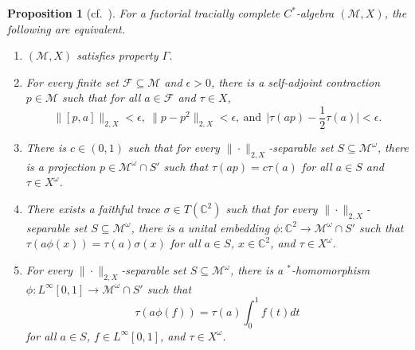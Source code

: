\documentclass[a4paper,11pt]{amsart}
\newtheorem{proposition}[theorem]{Proposition}
\theoremstyle{definition}
\numberwithin{equation}{section}
\numberwithin{theorem}{section}
\newcommand{\C}{\mathbb C}
\newcommand{\M}{\mathcal{M}}
\begin{document}
\begin{proposition}[{cf.\ \cite[Proposition~2.3]{CETW}}]\label{prop:Gamma}
For a factorial tracially complete $C^*$-algebra $(\M, X)$, the following are equivalent.
\begin{enumerate}[wide, labelwidth=0pt, labelindent=0pt]
	\item\label{item:Gamma} $(\M, X)$ satisfies property $\Gamma$.
	
		\item\label{item:Gamma-approx} For every finite set $\mathcal F \subseteq \M$ and $\epsilon > 0$, there is a self-adjoint contraction $p \in \M$ such that for all $a \in \mathcal F$ and $\tau \in X$,
	\begin{equation}
		\|[p, a]\|_{2, X} < \epsilon,\
		\|p - p^2\|_{2, X} < \epsilon,\ \text{and}\ \
		\big| \tau(ap) - \frac12 \tau(a)\big| < \epsilon.
	\end{equation}
	
	\item\label{item:approx-central-projection} There is  $c \in (0, 1)$ such that for every $\|\cdot\|_{2, X}$-separable set $S \subseteq \M^\omega$, there is a projection $p \in \M^\omega \cap S'$ such that $\tau(ap) = c \tau(a)$ for all $a \in S$ and $\tau \in X^\omega$.
 
\item\label{item:embeddingC2} There exists a faithful trace $\sigma \in T(\C^2)$ such that for every $\|\cdot\|_{2, X}$-separable set $S \subseteq \M^\omega$, there is a unital embedding $\phi\colon \C^2 \rightarrow \M^\omega \cap S'$ such that $\tau(a\phi(x)) = \tau(a)\sigma(x)$ for all $a \in S$, $x \in \C^2$, and $\tau \in X^\omega$.

 
  	\item\label{item:approx-central-interval} For every $\|\cdot\|_{2, X}$-separable set $S \subseteq \M^\omega$, there is a $^*$-homomorphism $\phi \colon L^\infty[0, 1] \rightarrow \M^\omega \cap S'$ such that 
	\begin{equation}
		\tau(a \phi(f)) = \tau(a) \int_0^1 f(t) dt
	\end{equation}
	for all $a \in S$, $f \in L^\infty[0, 1]$, and $\tau \in X^\omega$.
\end{enumerate}
\end{proposition}
\end{document}
